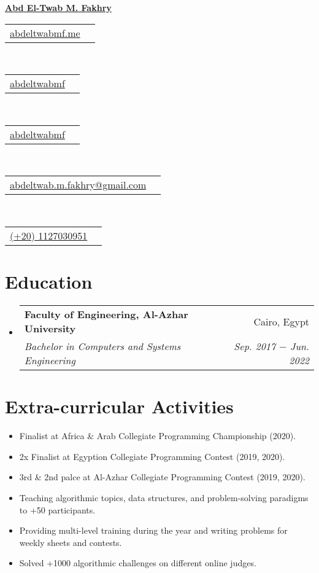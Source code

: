 \documentclass[letterpaper, 11pt]{article}
\makeatletter
\newcommand{\education}[5] {
  \vspace{-1pt}\item
  \begin{tabular*}{0.97\textwidth}[t]{l@{\extracolsep{\fill}}r}
    #1 \textbf{#2} & #3 \\
    \textit{\small #4} & \textit{\small #5} \\
  \end{tabular*}
  \vspace{-4pt}
}
\newcommand{\extracurricularactivity}[5] {
\item\small
  {#1}
  \href{#2}{\color{RoyalBlue}#3}
  \href{#4}{\color{RoyalBlue}#5}
  \vspace{-4pt}
}
\newcommand{\name}[2] {
  \textbf{
    \href{#1}{\Huge{#2}}
  }
  \vspace{-8pt}
}
\newcommand{\contact}[4] {
  \begin{tabular}{lr}
    {\href{#1}{\color{#3} #2 #4}}
  \end{tabular}
  \vspace{-4pt}
}
\makeatother
\begin{document}
\name{http://abdeltwabmf.me}{Abd El-Twab M. Fakhry}

\begin{center}
  \small
  \contact
  {https://abdeltwabmf.github.io}
  {\faIcon{globe}}{RoyalBlue}{abdeltwabmf.me}\,
  \contact
  {https://www.linkedin.com/in/abdeltwabmf}
  {\faIcon{linkedin}}{RoyalBlue}{abdeltwabmf}\,
  \contact
  {https://github.com/AbdeltwabMF}
  {\faIcon{github}}{RoyalBlue}{abdeltwabmf}\,
  \contact
  {mailto:abdeltwab.m.fakhry@gmail.com}
  {\faIcon{envelope}}{RoyalBlue}{abdeltwab.m.fakhry@gmail.com}\,
  \contact
  {tel:+201127030951}
  {\faIcon{mobile-alt}}{RoyalBlue}{(+20) 1127030951}
\end{center}\vspace{8pt}

\section{Education}
\begin{itemize}[leftmargin=*]
  \education
  {\faIcon{university}}
  {Faculty of Engineering, Al-Azhar University}{ Cairo, Egypt}
  {Bachelor in Computers and Systems Engineering}{ Sep. 2017 $-$ Jun. 2022}
\end{itemize}

\section{Extra-curricular Activities}
\begin{itemize}[leftmargin=*]
  \extracurricularactivity
  {Finalist at Africa \& Arab Collegiate Programming Championship (2020).}
  {https://icpc.global/ICPCID/S6R4YNB7PW7D}{\faIcon{link}}
  {https://drive.google.com/drive/folders/1u0_mdcJPAfc0o91xwnp9Y6JB8VDaY82e?usp=sharing}{}

  \extracurricularactivity
  {2x Finalist at Egyption Collegiate Programming Contest (2019, 2020).}
  {https://icpc.global/ICPCID/S6R4YNB7PW7D}{\faIcon{link}}
  {https://drive.google.com/drive/folders/1sjyZmHKeBmR2DB61ZGpJkiW17wtIWQ4q?usp=sharing}{}

  \extracurricularactivity
  {3rd \& 2nd palce at Al-Azhar Collegiate Programming Contest (2019, 2020).}
  {https://icpc.global/ICPCID/S6R4YNB7PW7D}{\faIcon{link}}
  {https://drive.google.com/drive/folders/18H79Bq42ARKxvx-H1pANSZgdD57EJMYF?usp=sharing}{}

  \extracurricularactivity
  {Teaching algorithmic topics, data structures, and problem-solving paradigms to +50 participants.}
  {https://sites.google.com/view/azharicpc/home}{}
  {}{}

  \extracurricularactivity
  {Providing multi-level training during the year and writing problems for weekly sheets and contests.}
  {https://sites.google.com/view/azharicpc/home}{}
  {}{}

  \extracurricularactivity
  {Solved +1000 algorithmic challenges on different online judges.}
  {https://github.com/AbdeltwabMF/online-judge-submissions-parser}{\faIcon{link}}
  {}{}
\end{itemize}
\end{document}
